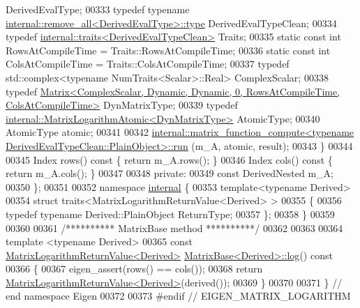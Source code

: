 \begin{DoxyCode}
      DerivedEvalType;
00333     \textcolor{keyword}{typedef} \textcolor{keyword}{typename} \hyperlink{group___sparse_core___module}{internal::remove\_all<DerivedEvalType>::type}
       DerivedEvalTypeClean;
00334     \textcolor{keyword}{typedef} \hyperlink{struct_eigen_1_1internal_1_1traits}{internal::traits<DerivedEvalTypeClean>} Traits;
00335     \textcolor{keyword}{static} \textcolor{keyword}{const} \textcolor{keywordtype}{int} RowsAtCompileTime = Traits::RowsAtCompileTime;
00336     \textcolor{keyword}{static} \textcolor{keyword}{const} \textcolor{keywordtype}{int} ColsAtCompileTime = Traits::ColsAtCompileTime;
00337     \textcolor{keyword}{typedef} std::complex<typename NumTraits<Scalar>::Real> ComplexScalar;
00338     \textcolor{keyword}{typedef} 
      \hyperlink{group___core___module_class_eigen_1_1_matrix}{Matrix<ComplexScalar, Dynamic, Dynamic, 0, RowsAtCompileTime, ColsAtCompileTime>}
       DynMatrixType;
00339     \textcolor{keyword}{typedef} \hyperlink{class_eigen_1_1internal_1_1_matrix_logarithm_atomic}{internal::MatrixLogarithmAtomic<DynMatrixType>} 
      AtomicType;
00340     AtomicType atomic;
00341     
00342     
      \hyperlink{struct_eigen_1_1internal_1_1matrix__function__compute_a55a328773f5254d0cd29ac699bc2634f}{internal::matrix\_function\_compute<typename DerivedEvalTypeClean::PlainObject>::run}
      (m\_A, atomic, result);
00343   \}
00344 
00345   Index rows()\textcolor{keyword}{ const }\{ \textcolor{keywordflow}{return} m\_A.rows(); \}
00346   Index cols()\textcolor{keyword}{ const }\{ \textcolor{keywordflow}{return} m\_A.cols(); \}
00347   
00348 \textcolor{keyword}{private}:
00349   \textcolor{keyword}{const} DerivedNested m\_A;
00350 \};
00351 
00352 \textcolor{keyword}{namespace }\hyperlink{namespaceinternal}{internal} \{
00353   \textcolor{keyword}{template}<\textcolor{keyword}{typename} Derived>
00354   \textcolor{keyword}{struct }traits<MatrixLogarithmReturnValue<Derived> >
00355   \{
00356     \textcolor{keyword}{typedef} \textcolor{keyword}{typename} Derived::PlainObject ReturnType;
00357   \};
00358 \}
00359 
00360 
00361 \textcolor{comment}{/********** MatrixBase method **********/}
00362 
00363 
00364 \textcolor{keyword}{template} <\textcolor{keyword}{typename} Derived>
00365 \textcolor{keyword}{const} \hyperlink{class_eigen_1_1_matrix_logarithm_return_value}{MatrixLogarithmReturnValue<Derived>} 
      \hyperlink{group___core___module_class_eigen_1_1_matrix_base}{MatrixBase<Derived>::log}()\textcolor{keyword}{ const}
00366 \textcolor{keyword}{}\{
00367   eigen\_assert(rows() == cols());
00368   \textcolor{keywordflow}{return} \hyperlink{class_eigen_1_1_matrix_logarithm_return_value}{MatrixLogarithmReturnValue<Derived>}(derived());
00369 \}
00370 
00371 \} \textcolor{comment}{// end namespace Eigen}
00372 
00373 \textcolor{preprocessor}{#endif // EIGEN\_MATRIX\_LOGARITHM}
\end{DoxyCode}
